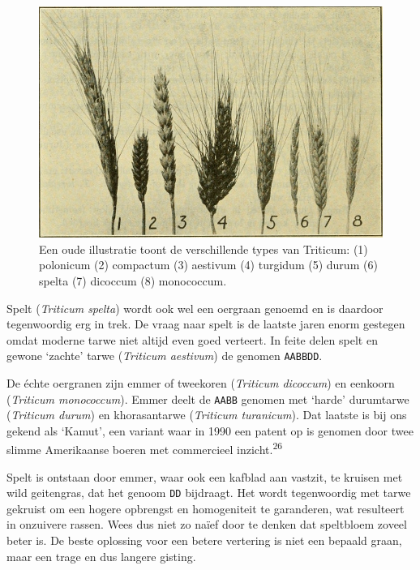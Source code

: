 \documentclass[
  11pt,
  dutch,
]{memoir}
\begin{document}
\begin{figure}
    \centering
    \includegraphics{img/bw/typeswheat.jpg}
    \caption[Een oude illustratie toont de verschillende types van Triticum. \textcopyright \: The Library of Congress]{Een oude illustratie toont de verschillende types van Triticum:
    (1) polonicum (2) compactum (3) aestivum (4) turgidum (5) durum (6)
    spelta (7) dicoccum (8) monococcum.}
\end{figure}

Spelt (\emph{Triticum spelta}) wordt ook wel een oergraan genoemd en is
daardoor tegenwoordig erg in trek. De vraag naar spelt is de laatste
jaren enorm gestegen omdat moderne tarwe niet altijd even goed verteert.
In feite delen spelt en gewone `zachte' tarwe (\emph{Triticum aestivum})
de genomen \texttt{AABBDD}.

De échte oergranen zijn emmer of tweekoren (\emph{Triticum dicoccum}) en
eenkoorn (\emph{Triticum monococcum}). Emmer deelt de \texttt{AABB}
genomen met `harde' durumtarwe (\emph{Triticum durum}) en khorasantarwe
(\emph{Triticum turanicum}). Dat laatste is bij ons gekend als `Kamut',
een variant waar in 1990 een patent op is genomen door twee slimme
Amerikaanse boeren met commercieel inzicht.\textsuperscript{26}

Spelt is ontstaan door emmer, waar ook een kafblad aan vastzit, te
kruisen met wild geitengras, dat het genoom \texttt{DD} bijdraagt. Het
wordt tegenwoordig met tarwe gekruist om een hogere opbrengst en
homogeniteit te garanderen, wat resulteert in onzuivere rassen. Wees dus
niet zo naïef door te denken dat speltbloem zoveel beter is. De beste
oplossing voor een betere vertering is niet een bepaald graan, maar een
trage en dus langere gisting.
\end{document}
